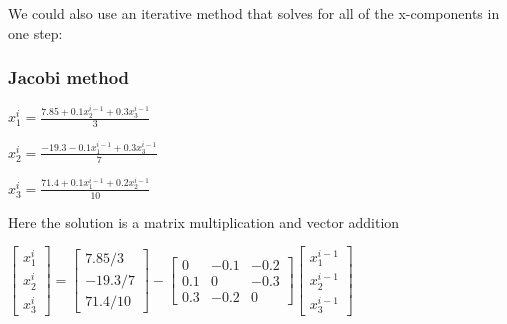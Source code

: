 \documentclass[11pt]{article}
\begin{document}
We could also use an iterative method that solves for all of the
x-components in one step:

\subsubsection{Jacobi method}\label{jacobi-method}

$x_{1}^{i}=\frac{7.85+0.1x_{2}^{i-1}+0.3x_{3}^{i-1}}{3}$

$x_{2}^{i}=\frac{-19.3-0.1x_{1}^{i-1}+0.3x_{3}^{i-1}}{7}$

$x_{3}^{i}=\frac{71.4+0.1x_{1}^{i-1}+0.2x_{2}^{i-1}}{10}$

Here the solution is a matrix multiplication and vector addition

$\left[ \begin{array}{c} x_{1}^{i} \\ x_{2}^{i} \\ x_{3}^{i} \end{array} \right]= \left[ \begin{array}{c} 7.85/3 \\ -19.3/7 \\ 71.4/10\end{array} \right]- \left[ \begin{array}{ccc} 0 & -0.1 & -0.2 \\ 0.1 & 0 & -0.3 \\ 0.3 & -0.2 & 0 \end{array} \right] \left[ \begin{array}{c} x_{1}^{i-1} \\ x_{2}^{i-1} \\ x_{3}^{i-1} \end{array} \right]$
\end{document}
